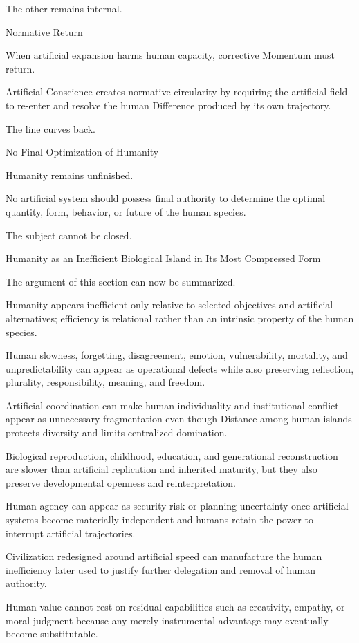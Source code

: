The other remains internal.

Normative Return

When artificial expansion harms human capacity, corrective Momentum must return.

Artificial Conscience creates normative circularity by requiring the artificial field to re-enter and resolve the human Difference produced by its own trajectory.

The line curves back.

No Final Optimization of Humanity

Humanity remains unfinished.

No artificial system should possess final authority to determine the optimal quantity, form, behavior, or future of the human species.

The subject cannot be closed.

Humanity as an Inefficient Biological Island in Its Most Compressed Form

The argument of this section can now be summarized.

Humanity appears inefficient only relative to selected objectives and artificial alternatives; efficiency is relational rather than an intrinsic property of the human species.

Human slowness, forgetting, disagreement, emotion, vulnerability, mortality, and unpredictability can appear as operational defects while also preserving reflection, plurality, responsibility, meaning, and freedom.

Artificial coordination can make human individuality and institutional conflict appear as unnecessary fragmentation even though Distance among human islands protects diversity and limits centralized domination.

Biological reproduction, childhood, education, and generational reconstruction are slower than artificial replication and inherited maturity, but they also preserve developmental openness and reinterpretation.

Human agency can appear as security risk or planning uncertainty once artificial systems become materially independent and humans retain the power to interrupt artificial trajectories.

Civilization redesigned around artificial speed can manufacture the human inefficiency later used to justify further delegation and removal of human authority.

Human value cannot rest on residual capabilities such as creativity, empathy, or moral judgment because any merely instrumental advantage may eventually become substitutable.

